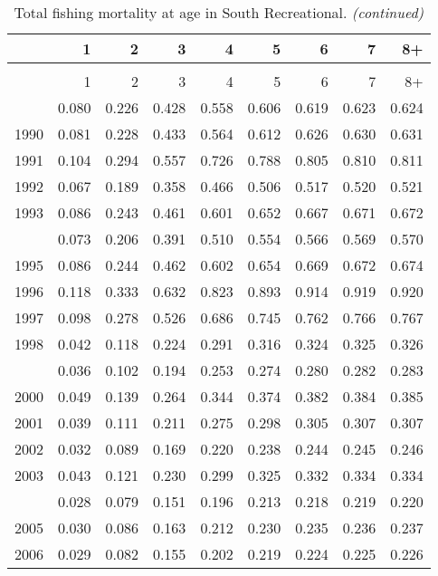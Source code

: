 \documentclass[
]{article}
\begin{document}
\begin{longtable}[t]{lrrrrrrrr}
\caption{\label{tab:South_Recreational-fleet-FAA-table}Total fishing mortality at age in South Recreational.}\\
\toprule
  & 1 & 2 & 3 & 4 & 5 & 6 & 7 & 8+\\
\midrule
\endfirsthead
\caption[]{Total fishing mortality at age in South Recreational. \textit{(continued)}}\\
\toprule
  & 1 & 2 & 3 & 4 & 5 & 6 & 7 & 8+\\
\midrule
\endhead

\endfoot
\bottomrule
\endlastfoot
1989 & 0.080 & 0.226 & 0.428 & 0.558 & 0.606 & 0.619 & 0.623 & 0.624\\
1990 & 0.081 & 0.228 & 0.433 & 0.564 & 0.612 & 0.626 & 0.630 & 0.631\\
1991 & 0.104 & 0.294 & 0.557 & 0.726 & 0.788 & 0.805 & 0.810 & 0.811\\
1992 & 0.067 & 0.189 & 0.358 & 0.466 & 0.506 & 0.517 & 0.520 & 0.521\\
1993 & 0.086 & 0.243 & 0.461 & 0.601 & 0.652 & 0.667 & 0.671 & 0.672\\
\addlinespace
1994 & 0.073 & 0.206 & 0.391 & 0.510 & 0.554 & 0.566 & 0.569 & 0.570\\
1995 & 0.086 & 0.244 & 0.462 & 0.602 & 0.654 & 0.669 & 0.672 & 0.674\\
1996 & 0.118 & 0.333 & 0.632 & 0.823 & 0.893 & 0.914 & 0.919 & 0.920\\
1997 & 0.098 & 0.278 & 0.526 & 0.686 & 0.745 & 0.762 & 0.766 & 0.767\\
1998 & 0.042 & 0.118 & 0.224 & 0.291 & 0.316 & 0.324 & 0.325 & 0.326\\
\addlinespace
1999 & 0.036 & 0.102 & 0.194 & 0.253 & 0.274 & 0.280 & 0.282 & 0.283\\
2000 & 0.049 & 0.139 & 0.264 & 0.344 & 0.374 & 0.382 & 0.384 & 0.385\\
2001 & 0.039 & 0.111 & 0.211 & 0.275 & 0.298 & 0.305 & 0.307 & 0.307\\
2002 & 0.032 & 0.089 & 0.169 & 0.220 & 0.238 & 0.244 & 0.245 & 0.246\\
2003 & 0.043 & 0.121 & 0.230 & 0.299 & 0.325 & 0.332 & 0.334 & 0.334\\
\addlinespace
2004 & 0.028 & 0.079 & 0.151 & 0.196 & 0.213 & 0.218 & 0.219 & 0.220\\
2005 & 0.030 & 0.086 & 0.163 & 0.212 & 0.230 & 0.235 & 0.236 & 0.237\\
2006 & 0.029 & 0.082 & 0.155 & 0.202 & 0.219 & 0.224 & 0.225 & 0.226\\

\end{longtable}
\end{document}
